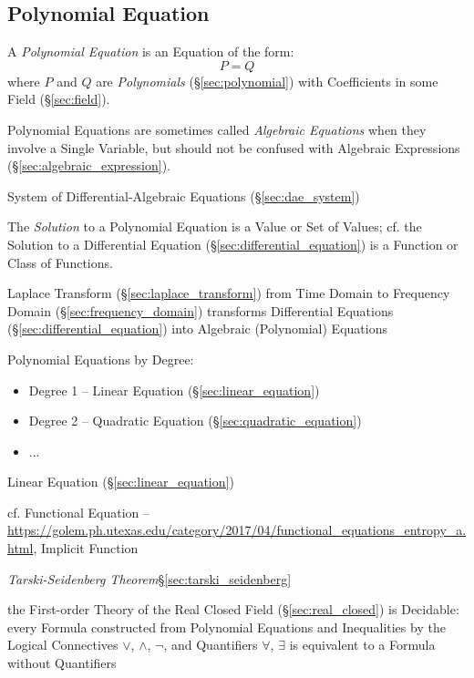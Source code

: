 \subsection{Polynomial Equation}\label{sec:polynomial_equation}

A \emph{Polynomial Equation} is an Equation of the form:
\[
  P = Q
\]
where $P$ and $Q$ are \emph{Polynomials} (\S\ref{sec:polynomial}) with
Coefficients in some Field (\S\ref{sec:field}).

\fist Polynomial Equations are sometimes called \emph{Algebraic Equations} when
they involve a Single Variable, but should not be confused with Algebraic
Expressions (\S\ref{sec:algebraic_expression}).

\fist System of Differential-Algebraic Equations (\S\ref{sec:dae_system})

The \emph{Solution} to a Polynomial Equation is a Value or Set of Values; cf.
the Solution to a Differential Equation (\S\ref{sec:differential_equation}) is
a Function or Class of Functions.

\fist Laplace Transform (\S\ref{sec:laplace_transform}) from Time Domain to
Frequency Domain (\S\ref{sec:frequency_domain}) transforms Differential
Equations (\S\ref{sec:differential_equation}) into Algebraic (Polynomial)
Equations

Polynomial Equations by Degree:
\begin{itemize}
  \item Degree 1 -- Linear Equation (\S\ref{sec:linear_equation})
  \item Degree 2 -- Quadratic Equation (\S\ref{sec:quadratic_equation})
  \item ...
\end{itemize}

Linear Equation (\S\ref{sec:linear_equation})

cf. Functional Equation --
\url{https://golem.ph.utexas.edu/category/2017/04/functional_equations_entropy_a.html},
Implicit Function %


\emph{Tarski-Seidenberg Theorem}\S\ref{sec:tarski_seidenberg}

the First-order Theory of the Real Closed Field (\S\ref{sec:real_closed}) is
Decidable: every Formula constructed from Polynomial Equations and Inequalities
by the Logical Connectives $\vee$, $\wedge$, $\neg$, and Quantifiers $\forall$,
$\exists$ is equivalent to a Formula without Quantifiers



